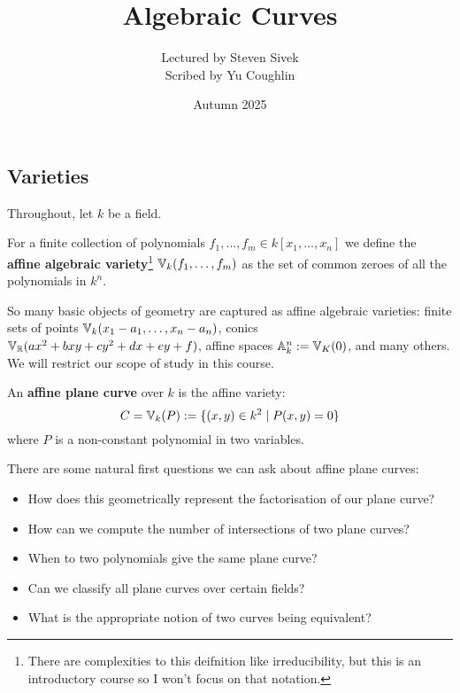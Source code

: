 \documentclass{article}
\begin{document}
\title{Algebraic Curves}
\author{Lectured by Steven Sivek \\
Scribed by Yu Coughlin}
\date{Autumn 2025}

\maketitle

\tableofcontents

\subsection{Varieties}

Throughout, let $k$ be a field.

\begin{definition}
    For a finite collection of polynomials $f_1,\ldots,f_m\in k[x_1,\ldots,x_n]$ we define the \textbf{affine algebraic variety}\footnote{There are complexities to this deifnition like irreducibility, but this is an introductory course so I won't focus on that notation.} $\mathbb{V}_k(f_1,\ldots,f_m)$ as the set of common zeroes of all the polynomials in $k^n$.
\end{definition}

So many basic objects of geometry are captured as affine algebraic varieties: finite sets of points $\mathbb{V}_k(x_1-a_1,\ldots,x_n-a_n)$, conics $\mathbb{V}_{\mathbb{R}}(ax^2+bxy+cy^2+dx+ey+f)$, affine spaces $\mathbb{A}_k^n := \mathbb{V}_K(0)$, and many others. We will restrict our scope of study in this course.

\begin{definition}
    An \textbf{affine plane curve} over $k$ is the affine variety: \[
        C = \mathbb{V}_k(P) := \{(x,y)\in k^2 \mid P(x,y) = 0\}
    \] where $P$ is a non-constant polynomial in two variables.
\end{definition}

There are some natural first questions we can ask about affine plane curves: 
\begin{itemize}
    \item How does this geometrically represent the factorisation of our plane curve?
    \item How can we compute the number of intersections of two plane curves?
    \item When to two polynomials give the same plane curve?
    \item Can we classify all plane curves over certain fields?
    \item What is the appropriate notion of two curves being equivalent?
\end{itemize}
\end{document}
